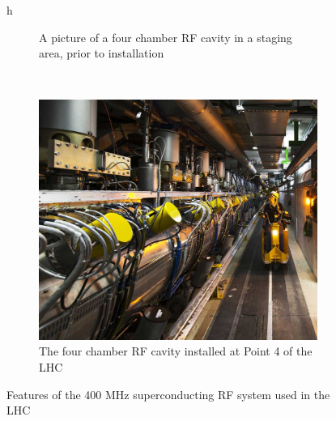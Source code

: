 \begin{figure}{h}
\begin{subfigure}[h]{0.450\textwidth}
        \caption{A picture of a four chamber RF cavity in a staging
          area, prior to installation \cite{LHC:LHC_lhc_rfcav_staged_image}}\label{fig:lhc_rf_staged}
      \end{subfigure}
      ~ %
      \begin{subfigure}[h]{0.450\textwidth}
        \includegraphics[width=\textwidth]{Figures/LHC_Diagrams/LHC_RFCavity_Installed.jpg}
        \caption{The four chamber RF cavity installed at Point 4 of
          the LHC \cite{LHC:LHC_lhc_rfcav_installed_image}}\label{fig:lhc_rf_at_p4}
      \end{subfigure}
      \caption{Features of the 400 MHz superconducting RF system used in the LHC}\label{fig:lhc_rf}
\end{figure}

